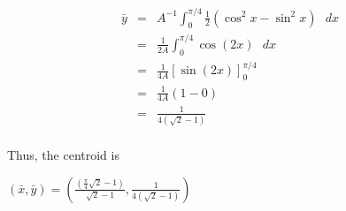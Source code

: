 \documentclass[paper=a4, fontsize=11pt]{scrartcl} %
\numberwithin{equation}{section} %
\numberwithin{figure}{section} %
\numberwithin{table}{section} %
\begin{document}
\begin{enumerate}
\begin{eqnarray*}
\bar{y} &=& A^{-1} \int_0^{\pi/4} \frac{1}{2} \left( \cos ^2 x - \sin ^2 x \right) \text{ } dx \\
&=& \frac{1}{2A} \int_0^{\pi/4} \cos(2x) \text{ } dx  \\
&=& \frac{1}{4A} \left[\sin(2x) \right]_0^{\pi/4} \\
&=& \frac{1}{4A}(1-0)\\
&=& \frac{1}{4(\sqrt{2}-1)} \\
\end{eqnarray*}

Thus, the centroid is \begin{large}$\boxed{(\bar{x},\bar{y})=\left(\frac{ \left( \frac{\pi}{4} \sqrt{2} -1\right)}{\sqrt{2}-1} ,\frac{1}{4(\sqrt{2}-1)}\right)}$\end{large}
\end{enumerate}

\end{document}
